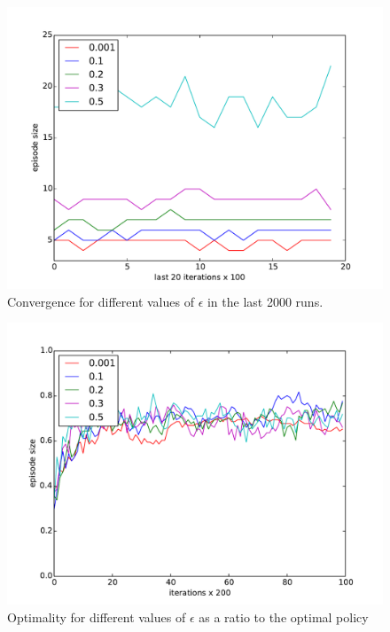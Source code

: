 \documentclass[paper=a4, fontsize=11pt]{scrartcl}
\numberwithin{equation}{section}		%
\numberwithin{figure}{section}			%
\numberwithin{table}{section}				%
\begin{document}
\begin{figure}[H] \centering
\includegraphics[scale=0.5]{epsilonlast20x100.pdf}
\caption{Convergence for different values of $\epsilon$ in the last 2000 runs.} 
\label{figure:epsilonlast20}
\end{figure}
\begin{figure}[H] \centering
\includegraphics[scale=0.6]{epsilonOptimality.pdf}
\caption{Optimality for different values of $\epsilon$ as a ratio to the optimal policy} 
\label{figure:epsilonOpti}
\end{figure}
\end{document}
